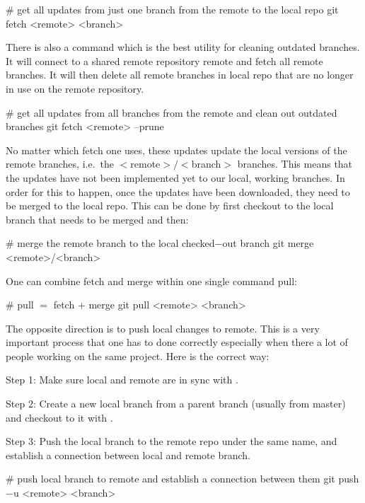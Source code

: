 \begin{bash}
# get all updates from just one branch from the remote to the local repo
git fetch <remote> <branch>
\end{bash}

There is also a command which is the best utility for cleaning outdated branches. It will connect to a shared remote
repository remote and fetch all remote branches. It will then delete all remote branches in local repo that are no
longer in use on the remote repository.

\begin{bash}
# get all updates from all branches from the remote and clean out outdated branches
git fetch <remote> --prune
\end{bash}

No matter which fetch one uses, these updates update the local versions of the remote branches, i.e.\ the
$<$remote$>/<$branch$>$ branches. This means that the updates have not been implemented yet to our local, working
branches. In order for this to happen, once the updates have been downloaded, they need to be merged to the local
repo. This can be done by first checkout to the local branch that needs to be merged and then:

\begin{bash}
# merge the remote branch to the local checked$-$out branch
git merge <remote>/<branch>
\end{bash}

One can combine fetch and merge within one single command pull:

\begin{bash}
# pull $=$ fetch $+$ merge
git pull <remote> <branch>
\end{bash}

The opposite direction is to push local changes to remote. This is a very important process that one has to done
correctly especially when there a lot of people working on the same project. Here is the correct way:
\bit
\item Step 1: Make sure local and remote are in sync with .
\item Step 2: Create a new local branch from a parent branch (usually from master) and checkout to it with .
\item Step 3: Push the local branch to the remote repo under the same name, and establish a connection between local and
remote branch.

\begin{bash}
# push local branch to remote and establish a connection between them
git push $-$u <remote> <branch>
\end{bash}

